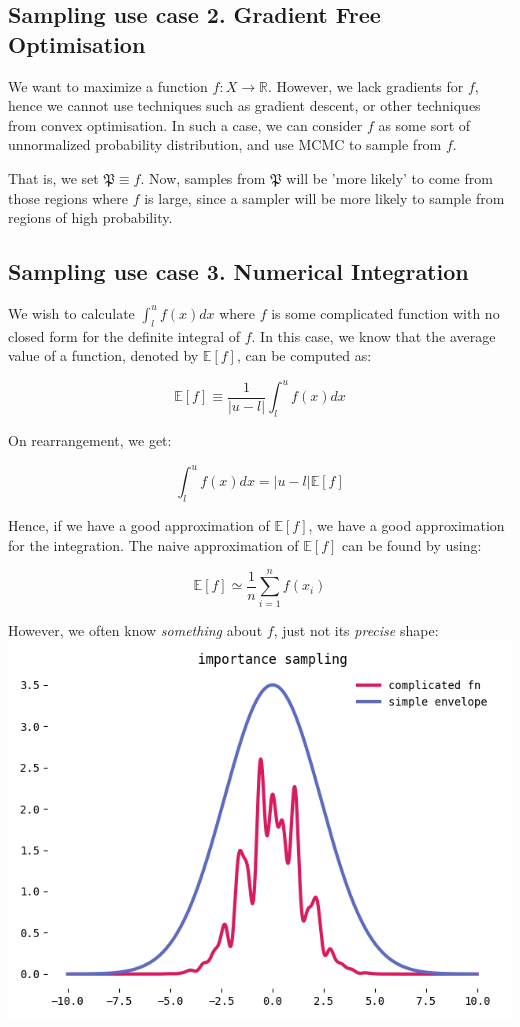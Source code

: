 \documentclass[titlepage]{article}
\newcommand{\R}{\mathbb{R}}
\newcommand{\E}[1]{\mathbb{E}\left[ #1 \right]}
\renewcommand{\P}{\mathfrak{P}}
\begin{document}
\subsection{Sampling use case 2. Gradient Free Optimisation}
We  want to maximize a function $f: X \rightarrow \R$. However, we lack
gradients for $f$, hence we cannot use techniques such as gradient
descent, or other techniques from convex optimisation.
In such a case, we can consider $f$ as some sort of unnormalized
probability distribution, and use MCMC to sample from $f$.

That is, we set $\P \equiv f$. Now, samples from $\P$ will be 'more likely'
to come from those regions where $f$ is large, since a sampler
will be more likely to sample from regions of high probability.


\subsection{Sampling use case 3. Numerical Integration}

We wish to calculate $\int_l^u f(x) dx$ where $f$ is some complicated 
function with no closed form for the definite integral of $f$. In this case,
we know that the average value of a function, denoted by $\E{f}$, can be
computed as:

$$
\E{f} \equiv \frac{1}{|u - l|} \int_l^u f(x) dx
$$

On rearrangement, we get:

$$
\int_l^u f(x) dx = |u - l| \E{f}
$$

Hence, if we have a good approximation of $\E{f}$, we have a good approximation
for the integration. The naive approximation of $\E{f}$ can be found by using:

$$
\E{f} \simeq \frac{1}{n} \sum_{i=1}^n f(x_i)
$$

However, we often know \emph{something} about $f$, just not its \emph{precise} shape:
\includegraphics[width=\textwidth]{complicated-fn-simple-envelope.png}
\end{document}

